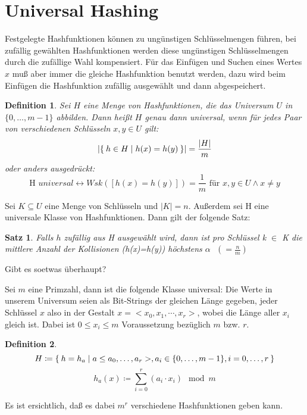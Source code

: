 \documentclass[ngerman,draft,parskip=half*,twoside]{scrreprt}
\theoremstyle{break}
\newtheorem{satz}{Satz}[chapter]
\newtheorem{definition}{Definition}[chapter]
\theoremstyle{nonumberbreak}
\DeclarePairedDelimiter{\abs}{\lvert}{\rvert}
\begin{document}
\section{Universal Hashing}
Festgelegte Hashfunktionen können zu ungünstigen Schlüsselmengen führen, bei zufällig gewählten Hashfunktionen
werden diese ungünstigen Schlüsselmengen durch die zufällige Wahl kompensiert. Für das Einfügen und Suchen eines Wertes
$x$ muß aber immer die gleiche Hashfunktion benutzt werden, dazu wird beim Einfügen die Hashfunktion zufällig
ausgewählt und dann abgespeichert.

\begin{definition}
Sei $H$ eine Menge von Hashfunktionen, die das Universum $U$ in $\{0, \ldots, m-1\}$ abbilden. Dann heißt $H$ genau dann
universal, wenn für jedes Paar von verschiedenen Schlüsseln $x, y \in
U$ gilt:
\begin{gather*}
  \abs{\Set{h \in H | h(x)=h(y)}} =\frac{\abs{H}}{m}
\end{gather*}
oder anders ausgedrückt:
\[\mbox{H }universal \leftrightarrow Wsk([h(x)=h(y)])=\frac{1}{m}
\mbox{ für }x,  y \in U \wedge x\neq y\]
\end{definition}

Sei $K \subseteq U$ eine Menge von Schlüsseln und $\vert K\vert =n$. Außerdem sei H eine universale Klasse von
Hashfunktionen. Dann gilt der folgende Satz:
\begin{satz}
Falls $h$ zufällig aus H ausgewählt wird, dann ist pro Schlüssel k $\in$ K die mittlere Anzahl der Kollisionen
(h(x)=h(y)) höchstens $\alpha \mbox{ } (=\frac{n}{m})$
\end{satz}
Gibt es soetwas überhaupt?

Sei $m$ eine Primzahl, dann ist die folgende Klasse universal:
Die Werte in unserem Universum seien als Bit-Strings der gleichen Länge gegeben, jeder Schlüssel $x$ also in der
Gestalt $x=<x_0, x_1, \cdots, x_r>$, wobei die Länge aller $x_i$ gleich ist.  Dabei ist $0\leq x_i\leq m$ Voraussetzung
bezüglich $m$ bzw. $r$.
\begin{definition}
\[H\coloneqq \Set{h=h_a | a\leq a_0, \ldots, a_r>, a_i \in \{0, \ldots, m-1\}, i=0, \ldots, r}\]
\[h_a(x)\coloneqq \sum_{i=0}^r (a_i \cdot x_i) \mod m\]
\end{definition}
Es ist ersichtlich, daß es dabei $m^r$ verschiedene Hashfunktionen geben kann.
\end{document}
